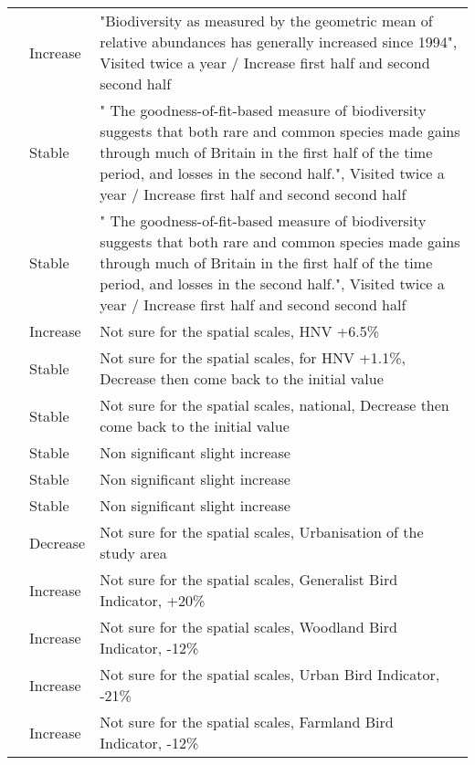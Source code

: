 \documentclass[
  12pt,
  oneside]{report}
\begin{document}
\begin{landscape}
\begin{longtable}[t]{ll>{\raggedright\arraybackslash}p{40em}}
\cite{harrison_quantifying_2016} & Increase & "Biodiversity as measured by the geometric mean of relative abundances has generally increased since 1994", Visited twice a year / Increase first half and second second half\\
\addlinespace
\cite{harrison_quantifying_2016} & Stable & " The goodness-of-fit-based measure of biodiversity suggests that both rare and common species made gains through much of Britain in the first half of the time period, and losses in the second half.", Visited twice a year / Increase first half and second second \vphantom{1} half\\
\cite{harrison_quantifying_2016} & Stable & " The goodness-of-fit-based measure of biodiversity suggests that both rare and common species made gains through much of Britain in the first half of the time period, and losses in the second half.", Visited twice a year / Increase first half and second second half\\
\cite{doxa_low-intensity_2010} & Increase & Not sure for the spatial scales, HNV +6.5\%\\
\cite{doxa_low-intensity_2010} & Stable & Not sure for the spatial scales, for HNV +1.1\%, Decrease then come back to the initial value\\
\cite{doxa_low-intensity_2010} & Stable & Not sure for the spatial scales, national, Decrease then come back to the initial value\\
\addlinespace
\cite{arnold_contrasting_2021} & Stable & Non significant slight \vphantom{2} increase\\
\cite{arnold_contrasting_2021} & Stable & Non significant slight \vphantom{1} increase\\
\cite{arnold_contrasting_2021} & Stable & Non significant slight increase\\
\cite{xu_detecting_2018} & Decrease & Not sure for the spatial scales, Urbanisation of the study area\\
\cite{jiguet_french_2012} & Increase & Not sure for the spatial scales, Generalist Bird Indicator, +20\%\\
\addlinespace
\cite{jiguet_french_2012} & Increase & Not sure for the spatial scales, Woodland Bird Indicator, -12\%\\
\cite{jiguet_french_2012} & Increase & Not sure for the spatial scales, Urban Bird Indicator, -21\%\\
\cite{jiguet_french_2012} & Increase & Not sure for the spatial scales, Farmland Bird Indicator, -12\%\\

\end{longtable}
\end{landscape}
\end{document}
